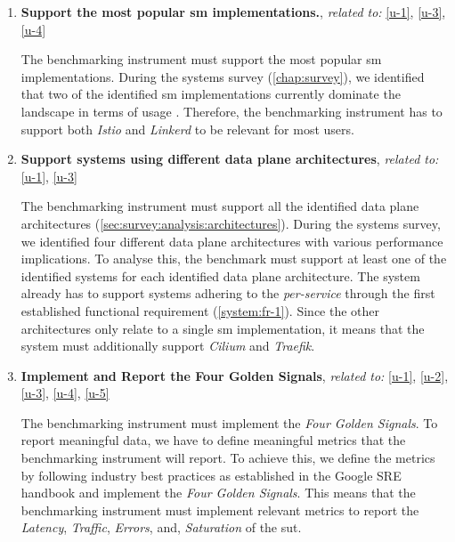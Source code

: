 \begin{enumerate}[label=\textbf{FR\arabic*}, leftmargin=3\parindent]
    \item \textbf{Support the most popular \gls{sm} implementations.}, \textit{related to:} \ref{u-1},  \ref{u-3}, \ref{u-4}
    \label{system:fr-1}
    
    The benchmarking instrument must support the most popular \gls{sm} implementations. During the systems survey (\cref{chap:survey}), we identified that two of the identified \gls{sm} implementations currently dominate the landscape in terms of usage \cite{cncf-survey-2021}. Therefore, the benchmarking instrument has to support both \textit{Istio} and \textit{Linkerd} to be relevant for most users. 
    
    \item \textbf{Support systems using different data plane architectures}, \textit{related to:} \ref{u-1}, \ref{u-3}
    \label{system:fr-2}
    
    The benchmarking instrument must support all the identified data plane architectures (\cref{sec:survey:analysis:architectures}). During the systems survey, we identified four different data plane architectures with various performance implications. To analyse this, the benchmark must support at least one of the identified systems for each identified data plane architecture. The system already has to support systems adhering to the \textit{per-service} through the first established functional requirement (\ref{system:fr-1}). Since the other architectures only relate to a single \gls{sm} implementation, it means that the system must additionally support  \textit{Cilium} and \textit{Traefik}.
    
    \item \textbf{Implement and Report the Four Golden Signals}, \textit{related to:} \ref{u-1}, \ref{u-2}, \ref{u-3}, \ref{u-4}, \ref{u-5} 
    \label{system:fr-3}
    
    The benchmarking instrument must implement the \textit{Four Golden Signals}. To report meaningful data, we have to define meaningful metrics that the benchmarking instrument will report. To achieve this, we define the metrics by following industry best practices as established in the Google SRE handbook \cite{google-sre} and implement the \textit{Four Golden Signals}. This means that the benchmarking instrument must implement relevant metrics to report the \textit{Latency}, \textit{Traffic}, \textit{Errors}, and, \textit{Saturation} of the \gls{sut}.
    

\end{enumerate}
